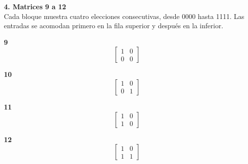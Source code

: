 \documentclass[11pt,a4paper,landscape]{article}
\begin{document}
\noindent\begin{minipage}{\linewidth}\textbf{4. Matrices 9 a 12}\\[2pt]Cada bloque muestra cuatro elecciones consecutivas, desde 0000 hasta 1111. Las entradas se acomodan primero en la fila superior y después en la inferior.
\par\smallskip \begin{minipage}[t]{.47\linewidth}\centering \textbf{9}\[\begin{bmatrix}1 & 0\\0 & 0\end{bmatrix}\]\end{minipage}\hfill\begin{minipage}[t]{.47\linewidth}\centering \textbf{10}\[\begin{bmatrix}1 & 0\\0 & 1\end{bmatrix}\]\end{minipage}\par\smallskip
\par\smallskip \begin{minipage}[t]{.47\linewidth}\centering \textbf{11}\[\begin{bmatrix}1 & 0\\1 & 0\end{bmatrix}\]\end{minipage}\hfill\begin{minipage}[t]{.47\linewidth}\centering \textbf{12}\[\begin{bmatrix}1 & 0\\1 & 1\end{bmatrix}\]\end{minipage}\par\smallskip
\end{minipage}\par\medskip
\end{document}
